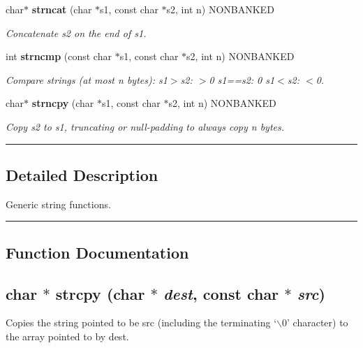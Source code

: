 \begin{CompactItemize}
\item 
char$\ast$ {\bf strncat} (char $\ast$s1, const char $\ast$s2, int n) NONBANKED
\begin{CompactList}\small\item\em Concatenate s2 on the end of s1.\item\end{CompactList}

\item 
\label{string.h_a7}
int {\bf strncmp} (const char $\ast$s1, const char $\ast$s2, int n) NONBANKED
\begin{CompactList}\small\item\em Compare strings (at most n bytes): s1$>$s2: $>$0 s1==s2: 0 s1$<$s2: $<$0.\item\end{CompactList}

\item 
char$\ast$ {\bf strncpy} (char $\ast$s1, const char $\ast$s2, int n) NONBANKED
\begin{CompactList}\small\item\em Copy s2 to s1, truncating or null-padding to always copy n bytes.\item\end{CompactList}

\end{CompactItemize}
\vspace{0.4cm}\hrule\vspace{0.2cm}
\subsection*{Detailed Description}
Generic string functions.\vspace{0.4cm}\hrule\vspace{0.2cm}
\subsection*{Function Documentation}
\label{string.h_a0}
\subsection{\setlength{\rightskip}{0pt plus 5cm}char $\ast$ strcpy (char $\ast$ {\em dest}, const char $\ast$ {\em src})}

Copies the string pointed to be src (including the terminating `$\backslash$0' character) to the array pointed to by dest.

